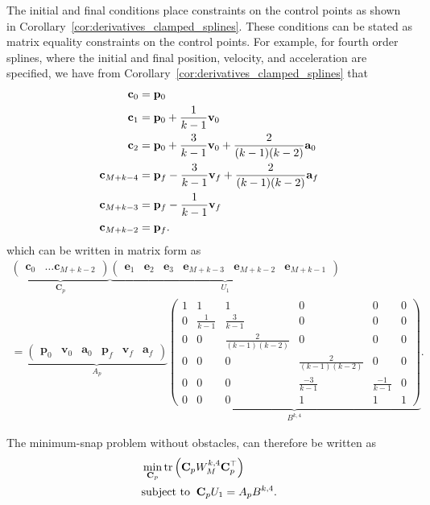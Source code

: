 The initial and final conditions place constraints on the control points as shown in Corollary~\ref{cor:derivatives_clamped_splines}.  These conditions can be stated as matrix equality constraints on the control points.  For example, for fourth order splines, where the initial and final position, velocity, and acceleration are specified, we have from Corollary~\ref{cor:derivatives_clamped_splines} that
\begin{align*}
			\mathbf{c}_0 &= \mathbf{p}_0 \\
			\mathbf{c}_1 &= \mathbf{p}_0 + \frac{1}{k-1} \mathbf{v}_0 \\
			\mathbf{c}_2 &= \mathbf{p}_0 + \frac{3}{k-1} \mathbf{v}_0 + \frac{2}{(k-1)(k-2)}\mathbf{a}_0 \\
			\mathbf{c}_{M+k-4} &= \mathbf{p}_f - \frac{3}{k-1}\mathbf{v}_f + \frac{2}{(k-1)(k-2)}\mathbf{a}_f \\
			\mathbf{c}_{M+k-3} &= \mathbf{p}_f - \frac{1}{k-1}\mathbf{v}_f \\
			\mathbf{c}_{M+k-2} &= \mathbf{p}_f.
\end{align*}
which can be written in matrix form as
\begin{multline*}
	\underbrace{\begin{pmatrix}\mathbf{c}_0 & \dots \mathbf{c}_{M+k-2} \end{pmatrix}}_{\mathbf{C}_p}
	\underbrace{\begin{pmatrix} \mathbf{e}_1 & \mathbf{e}_2 & \mathbf{e}_3 & \mathbf{e}_{M+k-3} & \mathbf{e}_{M+k-2} & \mathbf{e}_{M+k-1} \end{pmatrix}}_{U_1}
	\\ = 
	\underbrace{\begin{pmatrix}\mathbf{p}_0 & \mathbf{v}_0 & \mathbf{a}_0 & \mathbf{p}_f & \mathbf{v}_f & \mathbf{a}_f \end{pmatrix}}_{A_p}
	\underbrace{\begin{pmatrix} 1 & 1 & 1 & 0 & 0 & 0 \\ 0 & \frac{1}{k-1} & \frac{3}{k-1} & 0 & 0 & 0 \\ 0 & 0 & \frac{2}{(k-1)(k-2)} & 0 & 0 & 0 \\ 0 & 0 & 0 & \frac{2}{(k-1)(k-2)} & 0 & 0 \\ 0 & 0 & 0 & \frac{-3}{k-1} & \frac{-1}{k-1} & 0 \\ 0 & 0 & 0 & 1 & 1 & 1 \end{pmatrix}}_{B^{k,4}}.
\end{multline*}


The minimum-snap problem without obstacles, can therefore be written as
\begin{equation}
	\label{eq:min_snap_no_obstacles}
	\begin{aligned}
	&\min_{\mathbf{C}_p} \trace{\mathbf{C}_p W_M^{k,4} \mathbf{C}_p^\top} \\
	&\text{subject to } \: \mathbf{C}_p U_1 = A_p B^{k,4}. 
	\end{aligned}
\end{equation}


